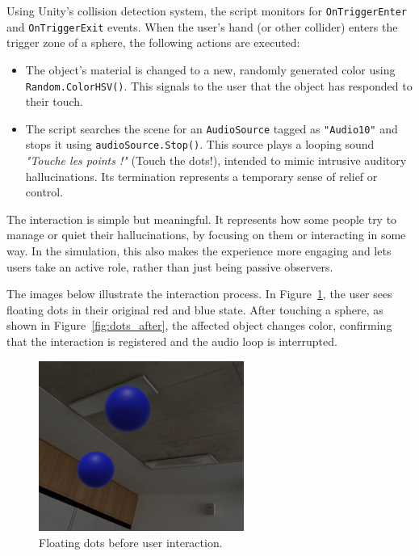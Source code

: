 \vspace{1em}

Using Unity's collision detection system, the script monitors for \texttt{OnTriggerEnter} and \texttt{OnTriggerExit} events. When the user's hand (or other collider) enters the trigger zone of a sphere, the following actions are executed:

\begin{itemize}
    \item The object's material is changed to a new, randomly generated color using \texttt{Random.ColorHSV()}. This signals to the user that the object has responded to their touch.
    \item The script searches the scene for an \texttt{AudioSource} tagged as \texttt{"Audio10"} and stops it using \texttt{audioSource.Stop()}. This source plays a looping sound \textit{"Touche les points !"} (Touch the dots!), intended to mimic intrusive auditory hallucinations. Its termination represents a temporary sense of relief or control.
\end{itemize}

The interaction is simple but meaningful. It represents how some people try to manage or quiet their hallucinations, by focusing on them or interacting in some way. In the simulation, this also makes the experience more engaging and lets users take an active role, rather than just being passive observers.

\vspace{1em}

The images below illustrate the interaction process. In Figure~\ref{fig:dots_before}, the user sees floating dots in their original red and blue state. After touching a sphere, as shown in Figure~\ref{fig:dots_after}, the affected object changes color, confirming that the interaction is registered and the audio loop is interrupted.

\begin{figure}[H]
    \centering
    \includegraphics[width=0.6\textwidth]{../../Figures/dots-video.jpg}
    \caption{Floating dots before user interaction.}
    \label{fig:dots_before}
\end{figure}

